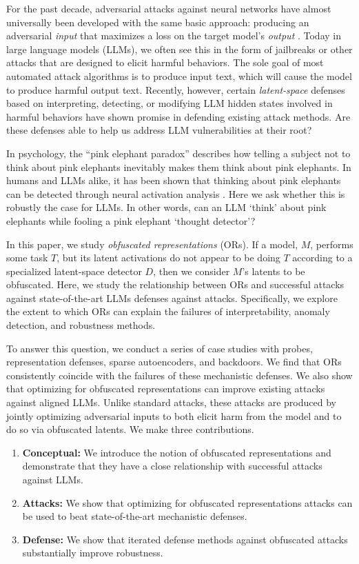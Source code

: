 \documentclass{article}
\begin{document}
For the past decade, adversarial attacks against neural networks have almost universally been developed with the same basic approach: producing an adversarial \textit{input} that maximizes a loss on the target model's \textit{output} \citep{szegedy2013intriguing, goodfellow2014explaining}. 
Today in large language models (LLMs), we often see this in the form of jailbreaks or other attacks that are designed to elicit harmful behaviors. 
The sole goal of most automated attack algorithms is to produce input text, which will cause the model to produce harmful output text. 
Recently, however, certain \textit{latent-space} defenses based on interpreting, detecting, or modifying LLM hidden states involved in harmful behaviors have shown promise in defending existing attack methods.
Are these defenses able to help us address LLM vulnerabilities at their root?

In psychology, the ``pink elephant paradox'' describes how telling a subject not to think about pink elephants inevitably makes them think about pink elephants. 
In humans and LLMs alike, it has been shown that thinking about pink elephants can be detected through neural activation analysis \citep{wylie2004don, hwang2024not}. 
Here we ask whether this is robustly the case for LLMs. In other words, can an LLM `think' about pink elephants while fooling a pink elephant `thought detector'?

In this paper, we study \emph{obfuscated representations} (ORs). 
If a model, $M$, performs some task $T$, but its latent activations do not appear to be doing $T$ according to a specialized latent-space detector $D$, then we consider $M$'s latents to be obfuscated.
Here, we study the relationship between ORs and successful attacks against state-of-the-art LLMs defenses against attacks.
Specifically, we explore the extent to which ORs can explain the failures of interpretability, anomaly detection, and robustness methods.

To answer this question, we conduct a series of case studies with probes, representation defenses, sparse autoencoders, and backdoors. 
We find that ORs consistently coincide with the failures of these mechanistic defenses. 
We also show that optimizing for obfuscated representations can improve existing attacks against aligned LLMs. 
Unlike standard attacks, these attacks are produced by jointly optimizing adversarial inputs to both elicit harm from the model and to do so via obfuscated latents. 
We make three contributions. 
\begin{enumerate}
    \item \textbf{Conceptual:} We introduce the notion of obfuscated representations and demonstrate that they have a close relationship with successful attacks against LLMs.
    \item \textbf{Attacks:} We show that optimizing for obfuscated representations attacks can be used to beat state-of-the-art mechanistic defenses. 
    \item \textbf{Defense:} We show that iterated defense methods against obfuscated attacks substantially improve robustness.
\end{enumerate}
\end{document}
